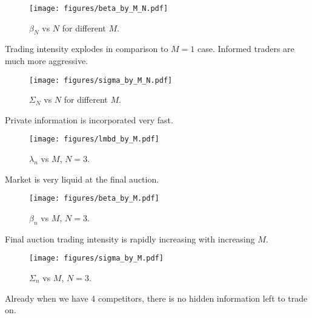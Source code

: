 \documentclass{beamer}
\begin{document}
\begin{frame}
    \begin{figure}\label{fig:beta_by_MN}
        \texttt{[image: figures/beta\_by\_M\_N.pdf]}
        \caption{$\beta_N$ vs $N$ for different $M$.}
    \end{figure}

    Trading intensity explodes in comparison to $M=1$ case. Informed traders are much more aggressive.

\end{frame}

\begin{frame}
    \begin{figure}\label{fig:sigma_by_MN}
        \texttt{[image: figures/sigma\_by\_M\_N.pdf]}
        \caption{$\Sigma_N$ vs $N$ for different $M$.}
    \end{figure}

    Private information is incorporated very fast.
\end{frame}

\begin{frame}
    \begin{figure}\label{fig:lambda_by_M}
        \texttt{[image: figures/lmbd\_by\_M.pdf]}
        \caption{$\lambda_n$ vs $M$, $N=3$.}
    \end{figure}

    Market is very liquid at the final auction.
\end{frame}

\begin{frame}
    \begin{figure}\label{fig:beta_by_M}
        \texttt{[image: figures/beta\_by\_M.pdf]}
        \caption{$\beta_n$ vs $M$, $N=3$.}
    \end{figure}

    Final auction trading intensity is rapidly increasing with increasing $M$.
\end{frame}

\begin{frame}
    \begin{figure}\label{fig:sigma_by_M}
        \texttt{[image: figures/sigma\_by\_M.pdf]}
        \caption{$\Sigma_n$ vs $M$, $N=3$.}
    \end{figure}

    Already when we have 4 competitors, there is no hidden information left to trade on.
\end{frame}
\end{document}
